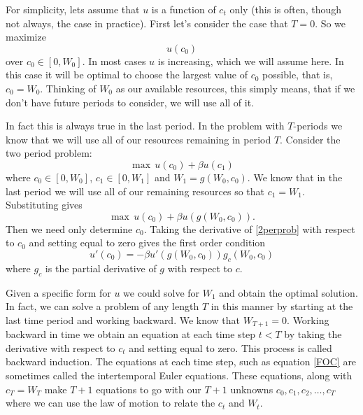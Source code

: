 For simplicity, lets assume that $u$ is a function of $c_t$ only (this is often, though not always, the case in practice).  First let's consider the case that $T=0$.  So we maximize
\begin{equation}\label{1perprob}
u(c_0)
\end{equation}
over $c_0 \in [0,W_0]$.  In most cases $u$ is increasing, which we will assume here.  In this case it will be optimal to choose the largest value of $c_0$ possible, that is, $c_0 = W_0$.  Thinking of $W_0$ as our available resources, this simply means, that if we don't have future periods to consider, we will use all of it.

In fact this is always true in the last period.  In the problem with $T$-periods we know that we will use all of our resources remaining in period $T$.  Consider the two period problem:
\begin{equation}\label{2perprob}
\max \, u(c_0) + \beta u(c_1)
\end{equation}
where $c_0 \in [0,W_0]$, $c_1 \in [0,W_1]$ and $W_1 = g(W_0,c_0)$.  We know that in the last period we will use all of our remaining resources so that $c_1 = W_1$.  Substituting gives
\begin{equation}
\max \, u(c_0) + \beta u(g(W_0,c_0)).
\end{equation}
Then we need only determine $c_0$.  Taking the derivative of \eqref{2perprob} with respect to $c_0$ and setting equal to zero gives the first order condition
\begin{equation}\label{FOC}
u'(c_0) = -\beta u'(g(W_0,c_0))g_c(W_0,c_0)
\end{equation}
where $g_c$ is the partial derivative of $g$ with respect to $c$.

Given a specific form for $u$ we could solve for $W_1$ and obtain the optimal solution.  In fact, we can solve a problem of any length $T$ in this manner by starting at the last time period and working backward.  We know that $W_{T+1} = 0$.  Working backward in time we obtain an equation at each time step $t<T$ by taking the derivative with respect to $c_t$ and setting equal to zero.  This process is called backward induction.  The equations at each time step, such as equation \eqref{FOC} are sometimes called the intertemporal Euler equations.  These equations, along with $c_T = W_T$ make $T+1$ equations to go with our $T+1$ unknowns $c_0,c_1,c_2,\ldots,c_T$ where we can use the law of motion to relate the $c_t$ and $W_t$.

